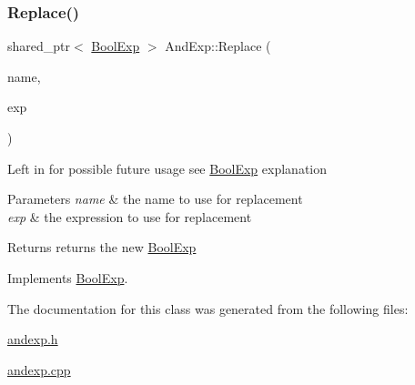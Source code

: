 \subsubsection{\texorpdfstring{Replace()}{Replace()}}
{\footnotesize\ttfamily shared\+\_\+ptr$<$ \mbox{\hyperlink{classBoolExp}{Bool\+Exp}} $>$ And\+Exp\+::\+Replace (\begin{DoxyParamCaption}\item[{string}]{name,  }\item[{\mbox{\hyperlink{classBoolExp}{Bool\+Exp}} \&}]{exp }\end{DoxyParamCaption})\hspace{0.3cm}{\ttfamily [virtual]}}

Left in for possible future usage see \mbox{\hyperlink{classBoolExp}{Bool\+Exp}} explanation 
\begin{DoxyParams}{Parameters}
{\em name} & the name to use for replacement \\
\hline
{\em exp} & the expression to use for replacement \\
\hline
\end{DoxyParams}
\begin{DoxyReturn}{Returns}
returns the new \mbox{\hyperlink{classBoolExp}{Bool\+Exp}} 
\end{DoxyReturn}


Implements \mbox{\hyperlink{classBoolExp_a6448b7121c238759cc9cc8e48d6f8773}{Bool\+Exp}}.



The documentation for this class was generated from the following files\+:\begin{DoxyCompactItemize}
\item 
\mbox{\hyperlink{andexp_8h}{andexp.\+h}}\item 
\mbox{\hyperlink{andexp_8cpp}{andexp.\+cpp}}\end{DoxyCompactItemize}
